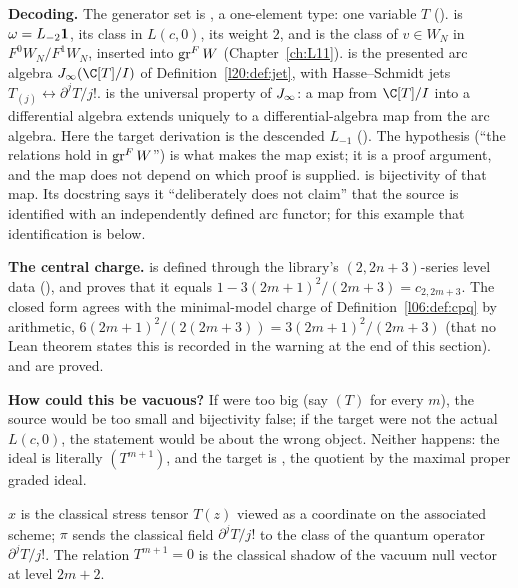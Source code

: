 \begin{dictionary}
\textbf{Decoding.} The generator set is , a one-element type: one variable $T$ ().
 is $\omega=L_{-2}\mathbf{1}$,  its class in $L(c,0)$,  its weight $2$, and
 is the class of $v\in W_N$ in $F^0W_N/F^1W_N$, inserted into $\operatorname{gr}^F W$
(Chapter~\ref{ch:L11}).  is the presented arc algebra $\ltwentyJ(\C[T]/I)$ of
Definition~\ref{l20:def:jet}, with Hasse--Schmidt jets $T_{(j)}\leftrightarrow\partial^jT/j!$.
 is the universal property of $J_\infty$: a map from $\C[T]/I$ into a differential
algebra extends uniquely to a differential-algebra map from the arc algebra. Here the target derivation is the descended
$L_{-1}$ (). The hypothesis  (``the relations hold in $\operatorname{gr}^F W$'') is
what makes the map exist; it is a proof argument, and the map does not depend on which proof is supplied.
 is bijectivity of that map. Its docstring says it ``deliberately does not claim'' that the
source is identified with an independently defined arc functor; for this example that identification is
 below.

\textbf{The central charge.}  is defined through the library's $(2,2n+3)$-series level data
(), and  proves that it equals $1-3(2m+1)^2/(2m+3)=c_{2,2m+3}$. The closed form agrees with the
minimal-model charge of Definition~\ref{l06:def:cpq} by arithmetic, $6(2m+1)^2/(2(2m+3))=3(2m+1)^2/(2m+3)$ (that no Lean
theorem states this is recorded in the warning at the end of this section).  and  are proved.

\textbf{How could this be vacuous?} If  were too big (say $(T)$ for every $m$), the source would be
too small and bijectivity false; if the target were not the actual $L(c,0)$, the statement would be about the wrong
object. Neither happens: the ideal is literally $(T^{m+1})$, and the target is , the quotient by
the maximal proper graded ideal.
\end{dictionary}

\begin{physics}
$x$ is the classical stress tensor $T(z)$ viewed as a coordinate on the associated scheme; $\pi$ sends the classical
field $\partial^jT/j!$ to the class of the quantum operator $\partial^jT/j!$. The relation $T^{m+1}=0$ is the classical
shadow of the vacuum null vector at level $2m+2$.
\end{physics}

